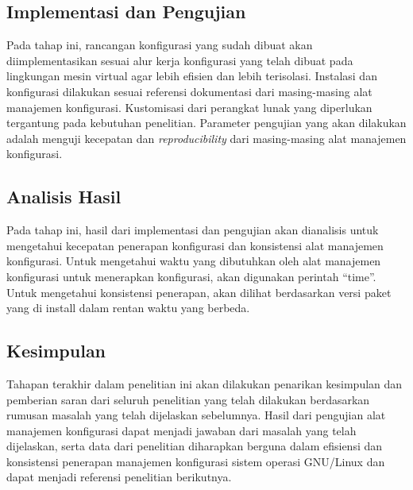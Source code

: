 \documentclass[10pt,]{report}
\begin{document}
\begin{adjustwidth}{7mm}{}
	\subsection{Implementasi dan Pengujian}
	\vspace{-3mm}
	\begin{adjustwidth}{6mm}{}
		Pada tahap ini, rancangan konfigurasi yang sudah dibuat akan
		diimplementasikan sesuai alur kerja konfigurasi yang telah dibuat pada
		lingkungan mesin virtual agar lebih efisien dan lebih terisolasi. Instalasi
		dan konfigurasi dilakukan sesuai referensi dokumentasi dari masing-masing
		alat manajemen konfigurasi. Kustomisasi dari perangkat lunak yang
		diperlukan tergantung pada kebutuhan penelitian. Parameter pengujian yang
		akan dilakukan adalah menguji kecepatan dan \textit{reproducibility} dari
		masing-masing alat manajemen konfigurasi.
	\end{adjustwidth}
\end{adjustwidth}
\begin{adjustwidth}{7mm}{}
	\subsection{Analisis Hasil}
	\vspace{-3mm}
	\begin{adjustwidth}{6mm}{}
		Pada tahap ini, hasil dari implementasi dan pengujian akan dianalisis untuk
		mengetahui kecepatan penerapan konfigurasi dan konsistensi alat manajemen
		konfigurasi. Untuk mengetahui waktu yang dibutuhkan oleh alat manajemen
		konfigurasi untuk menerapkan konfigurasi, akan digunakan perintah “time”.
		Untuk mengetahui konsistensi penerapan, akan dilihat berdasarkan versi
		paket yang di install dalam rentan waktu yang berbeda.
	\end{adjustwidth}
\end{adjustwidth}

\begin{adjustwidth}{7mm}{}
	\subsection{Kesimpulan}
	\vspace{-3mm}
	\begin{adjustwidth}{6mm}{}
		Tahapan terakhir dalam penelitian ini akan dilakukan penarikan kesimpulan
		dan pemberian saran dari seluruh penelitian yang telah dilakukan
		berdasarkan rumusan masalah yang telah dijelaskan sebelumnya. Hasil dari
		pengujian alat manajemen konfigurasi dapat menjadi jawaban dari masalah
		yang telah dijelaskan, serta data dari penelitian diharapkan berguna dalam
		efisiensi dan konsistensi penerapan manajemen konfigurasi sistem operasi
		GNU/Linux dan dapat menjadi referensi penelitian berikutnya.
	\end{adjustwidth}
\end{adjustwidth}
\vspace{3mm}
\end{document}

